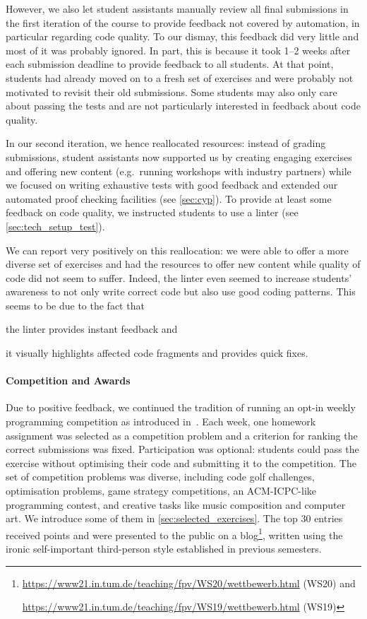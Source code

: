However, we also let student assistants manually review all final submissions
in the first iteration of the course
to provide feedback not covered by automation,
in particular regarding code quality.
To our dismay, this feedback did very little and
most of it was probably ignored.
In part, this is because it took 1--2 weeks after each submission deadline to provide feedback to all students.
At that point, students had already moved on to a fresh set of exercises and were probably not motivated to revisit their old submissions.
Some students may also only care about passing the tests
and are not particularly interested in feedback about code quality.

In our second iteration, we hence reallocated resources:
instead of grading submissions,
student assistants now supported us by creating engaging exercises
and offering new content (e.g.\ running workshops with industry partners)
while we focused on writing exhaustive tests with good feedback and extended our automated proof checking facilities (see \cref{sec:cyp}).
To provide at least some feedback on
code quality, we instructed students
to use a linter (see \cref{sec:tech_setup_test}).

We can report very positively on this reallocation:
we were able to offer a more diverse set of exercises and
had the resources to offer new content
while quality of code did not seem to suffer.
Indeed, the linter even seemed to increase students' awareness
to not only write correct code but also use good coding patterns.
This seems to be due to the fact that
\begin{enumerate*}[label=\arabic*)]
  \item the linter provides instant feedback and
  \item it visually highlights affected code fragments and provides quick fixes.
\end{enumerate*}

\paragraph{Competition and Awards}

Due to positive feedback,
we continued the tradition of running an opt-in weekly
programming competition as introduced in~\cite{next_1100}.
Each week, one homework assignment
was selected as a competition problem
and a criterion for ranking the correct submissions was fixed.
Participation was optional:
students could pass the exercise without optimising their code and submitting it to the competition.
The set of competition problems was diverse,
including code golf challenges,
optimisation problems,
game strategy competitions,
an ACM-ICPC-like programming contest,
and creative tasks like music composition
and computer art.
We introduce some of them in \cref{sec:selected_exercises}.
The top 30 entries received points
and were presented to the public on a blog\footnote{\url{https://www21.in.tum.de/teaching/fpv/WS20/wettbewerb.html} (WS20) and

\url{https://www21.in.tum.de/teaching/fpv/WS19/wettbewerb.html} (WS19)},
written using the ironic self-important third-person style established in previous semesters.

